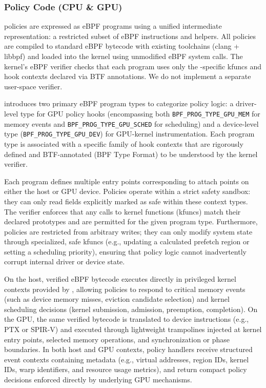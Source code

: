 \subsubsection{Policy Code (CPU \& GPU)}

\sys policies are expressed as eBPF programs using a unified intermediate representation: a restricted subset of eBPF instructions and helpers. All \sys policies are compiled to standard eBPF bytecode with existing toolchains (clang + libbpf) and loaded into the kernel using unmodified eBPF system calls. The kernel's eBPF verifier checks that each program uses only the \sys-specific kfuncs and hook contexts declared via BTF annotations. We do not implement a separate user-space verifier.

\sys introduces two primary eBPF program types to categorize policy logic:
a driver-level type for GPU policy hooks (encompassing both \texttt{BPF\_PROG\_TYPE\_GPU\_MEM} for memory events and \texttt{BPF\_PROG\_TYPE\_GPU\_SCHED} for scheduling) and a device-level type (\texttt{BPF\_PROG\_TYPE\_GPU\_DEV}) for GPU-kernel instrumentation. Each program type is associated with a specific family of hook contexts that are rigorously defined and BTF-annotated (BPF Type Format) to be understood by the kernel verifier.

Each program defines multiple entry points corresponding to attach points on either the host or GPU device. Policies operate within a strict safety sandbox: they can only read fields explicitly marked as safe within these context types. The verifier enforces that any calls to kernel functions (kfuncs) match their declared prototypes and are permitted for the given program type. Furthermore, policies are restricted from arbitrary writes; they can only modify system state through specialized, safe kfuncs (e.g., updating a calculated prefetch region or setting a scheduling priority), ensuring that policy logic cannot inadvertently corrupt internal driver or device state.

On the host, verified eBPF bytecode executes directly in privileged kernel contexts provided by \sysdriver, allowing policies to respond to critical memory events (such as device memory misses, eviction candidate selection) and kernel scheduling decisions (kernel submission, admission, preemption, completion). On the GPU, the same verified bytecode is translated to device instructions (e.g., PTX or SPIR-V) and executed through lightweight trampolines injected at kernel entry points, selected memory operations, and synchronization or phase boundaries. In both host and GPU contexts, policy handlers receive structured event contexts containing metadata (e.g., virtual addresses, region IDs, kernel IDs, warp identifiers, and resource usage metrics), and return compact policy decisions enforced directly by underlying GPU mechanisms.

